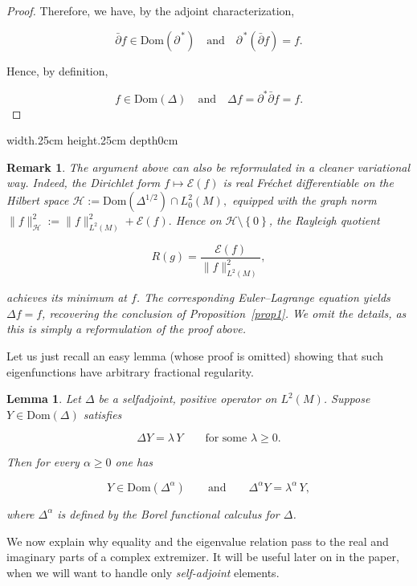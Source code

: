 \documentclass[10pt,a4paper,reqno]{amsart}
\newtheorem{lemma}[theorem]{Lemma}
\newtheorem{remark}[theorem]{Remark}
\def\qed{ \hfill \vrule width.25cm height.25cm depth0cm\smallskip}
\newcommand{\Dom}{\mathrm{Dom}}
\begin{document}
\begin{proof}
Therefore, we have, by the adjoint characterization,


\[
\bar\partial f\in \Dom(\partial^{\,*}) 
\quad\text{and}\quad 
\partial^{\,*}(\bar\partial f)=f.
\]


Hence, by definition,


\[
f\in \Dom(\Delta)
\quad\text{and}\quad 
\Delta f=\partial^{*}\bar\partial f=f.
\]


\end{proof}

\qed



\begin{remark}
The argument above can also be reformulated in a \emph{cleaner} variational way.  
Indeed, the Dirichlet form $
f\mapsto \mathcal{E}(f)$ is \emph{real} Fr\'echet differentiable on the Hilbert space $
\mathcal{H}:=\Dom(\Delta^{1/2})\cap L_0^2(M),
$ equipped with the graph norm 
\(
\|f\|_{\mathcal{H}}^2:=\|f\|_{L^2(M)}^2+\mathcal{E}(f).
\) 
Hence on $\mathcal{H}\setminus \left\{0\right\}$, the Rayleigh quotient


\[
R(g)=\frac{\mathcal{E}(f)}{\|f\|_{L^2(M)}^2},
\]


achieves its minimum at $f$.  
The corresponding Euler--Lagrange equation yields 
\(\Delta f = f\), 
recovering the conclusion of Proposition~\ref{prop1}.  
We omit the details, as this is simply a reformulation of the proof above.
\end{remark}


Let us just recall an easy lemma (whose proof is omitted) showing that such eigenfunctions have arbitrary fractional regularity.
\begin{lemma}\label{regul}
Let $\Delta$ be a selfadjoint, positive operator on $L^2(M)$.
Suppose $Y\in \Dom(\Delta)$ satisfies


\[
\Delta Y=\lambda\,Y \qquad \text{for some } \lambda\ge 0.
\]


Then for every $\alpha\ge 0$ one has


\[
Y\in \Dom(\Delta^\alpha)
\qquad\text{and}\qquad
\Delta^\alpha Y = \lambda^\alpha\,Y,
\]


where $\Delta^\alpha$ is defined by the Borel functional calculus for $\Delta$.
\end{lemma}


\begin{flushleft}
We now explain why equality and the eigenvalue relation pass to the real and imaginary parts of a complex extremizer. It will be useful later on in the paper, when we will want to handle only \emph{self-adjoint} elements.
\end{flushleft}
\end{document}
